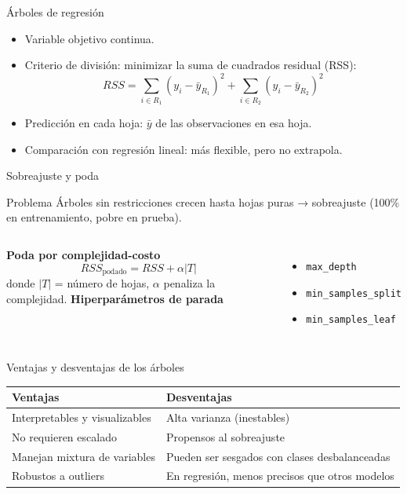 \documentclass[aspectratio=169, 10pt, xcolor=table]{beamer}
\begin{document}
\begin{frame}{Árboles de regresión}
    \begin{itemize}
        \item Variable objetivo continua.
        \item Criterio de división: minimizar la suma de cuadrados residual (RSS):
        \[
        RSS = \sum_{i \in R_1} (y_i - \bar{y}_{R_1})^2 + \sum_{i \in R_2} (y_i - \bar{y}_{R_2})^2
        \]
        \item Predicción en cada hoja: $\bar{y}$ de las observaciones en esa hoja.
        \item Comparación con regresión lineal: más flexible, pero no extrapola.
    \end{itemize}
\end{frame}

\begin{frame}{Sobreajuste y poda}
    \begin{alertblock}{Problema}
        Árboles sin restricciones crecen hasta hojas puras → sobreajuste (100\% en entrenamiento, pobre en prueba).
    \end{alertblock}
    \begin{columns}[t]
        \textbf{Poda por complejidad-costo}
        \[
        RSS_{\text{podado}} = RSS + \alpha |T|
        \]
        donde $|T|$ = número de hojas, $\alpha$ penaliza la complejidad.
        \textbf{Hiperparámetros de parada}
        \begin{itemize}
            \item \texttt{max\_depth}
            \item \texttt{min\_samples\_split}
            \item \texttt{min\_samples\_leaf}
        \end{itemize}
    \end{columns}
\end{frame}

\begin{frame}{Ventajas y desventajas de los árboles}
    \begin{table}
        \centering
        \begin{tabular}{p{4.5cm}|p{4.5cm}}
            \toprule
            \textbf{Ventajas} & \textbf{Desventajas} \\
            \midrule
            Interpretables y visualizables & Alta varianza (inestables) \\
            No requieren escalado & Propensos al sobreajuste \\
            Manejan mixtura de variables & Pueden ser sesgados con clases desbalanceadas \\
            Robustos a outliers & En regresión, menos precisos que otros modelos \\
            \bottomrule
        \end{tabular}
    \end{table}
\end{frame}
\end{document}
